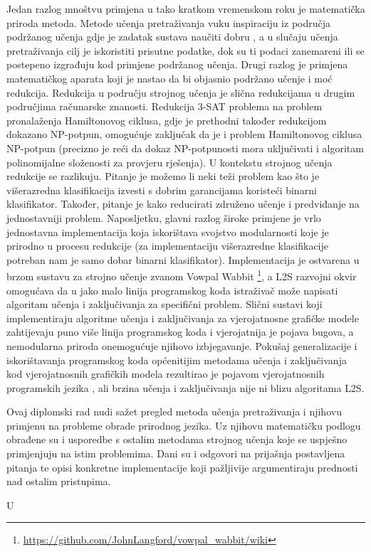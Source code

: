 Jedan razlog mnoštvu primjena u tako kratkom vremenskom roku je matematička
priroda metoda. Metode učenja pretraživanja vuku inspiraciju iz područja
podržanog učenja  gdje je zadatak sustava naučiti
dobru , a u slučaju učenja
pretraživanja cilj je iskoristiti prisutne podatke, dok su ti podaci zanemareni
ili se postepeno izgrađuju kod primjene podržanog učenja. Drugi razlog je
primjena matematičkog aparata koji je nastao da bi objasnio podržano učenje i
moć redukcija. Redukcija u području strojnog učenja je slična redukcijama u
drugim područjima računarske znanosti. Redukcija 3-SAT problema na problem
pronalaženja Hamiltonovog ciklusa, gdje je prethodni također redukcijom dokazano
NP-potpun, omogućuje zaključak da je i problem Hamiltonovog ciklusa NP-potpun
(precizno je reći da dokaz NP-potpunosti mora uključivati i algoritam
polinomijalne složenosti za provjeru rješenja). U kontekstu strojnog učenja
redukcije se razlikuju. Pitanje je možemo li neki teži problem kao što je
višerazredna klasifikacija izvesti s dobrim garancijama koristeći binarni
klasifikator. Također, pitanje je kako reducirati združeno učenje i predviđanje
 na jednostavniji problem. Naposljetku,
glavni razlog široke primjene je vrlo jednostavna implementacija koja
iskorištava svojstvo modularnosti koje je prirodno u procesu redukcije (za
implementaciju višerazredne klasifikacije potreban nam je samo dobar binarni
klasifikator). Implementacija je ostvarena u brzom sustavu za strojno učenje
zvanom Vowpal Wabbit
\footnote{\url{https://github.com/JohnLangford/vowpal_wabbit/wiki}}, a
\textsc{L2S} razvojni okvir omogućava da u jako malo linija programskog koda
istraživač može napisati algoritam učenja i zaključivanja za specifični problem.
Slični sustavi koji implementiraju algoritme učenja i zaključivanja za
vjerojatnosne grafičke modele zahtijevaju puno više linija programskog koda i
vjerojatnija je pojava bugova, a nemodularna priroda onemogućuje njihovo
izbjegavanje. Pokušaj generalizacije i iskorištavanja programskog koda
općenitijim metodama učenja i zaključivanja kod vjerojatnosnih grafičkih modela
rezultirao je pojavom vjerojatnosnih programskih jezika , ali brzina učenja i zaključivanja nije ni blizu
algoritama \textsc{L2S}.

Ovaj diplomski rad nudi sažet pregled metoda učenja pretraživanja i njihovu
primjenu na probleme obrade prirodnog jezika. Uz njihovu matematičku podlogu
obrađene su i usporedbe s ostalim metodama strojnog učenja koje se uspješno
primjenjuju na istim problemima. Dani su i odgovori na prijašnja postavljena
pitanja te opisi konkretne implementacije koji pažljivije argumentiraju
prednosti nad ostalim pristupima.

U 
